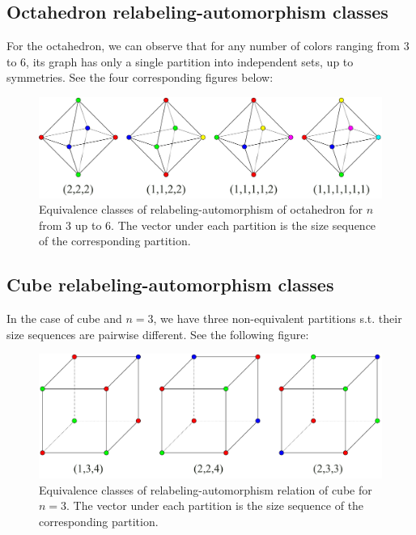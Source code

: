 \subsection{Octahedron relabeling-automorphism classes}

For the octahedron, we can observe that for any number of colors ranging from $3$ to $6$, its graph has only a single partition into independent sets, up to symmetries. See the four corresponding figures below:

\begin{figure}[H]
    \centering
    \includegraphics[width=1\textwidth]{Resources/Figs/octahedron-relaut-classes.pdf}
    \caption{Equivalence classes of relabeling-automorphism of octahedron for $n$ from $3$ up to $6$. The vector under each partition is the size sequence of the corresponding partition.}
    \label{fig:octahedron-relaut-classes}
\end{figure}

\subsection{Cube relabeling-automorphism classes}

In the case of cube and $n=3$, we have three non-equivalent partitions s.t. their size sequences are pairwise different. See the following figure: 

\begin{figure}[H]
    \centering
    \includegraphics[width=1\textwidth]{Resources/Figs/cube_non_relaut-3-clrings.pdf}
    \caption{Equivalence classes of relabeling-automorphism relation of cube for $n=3$. The vector under each partition is the size sequence of the corresponding partition.}
    \label{fig:cube-3clring-relaut-classes}
\end{figure}

